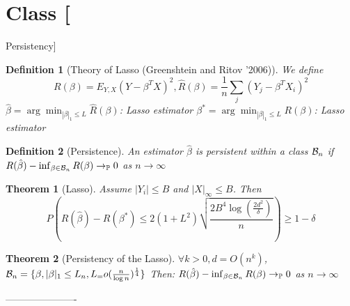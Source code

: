 \documentclass{article}
\newtheorem{theorem}{Theorem}
\newtheorem{definition}{Definition}
\newenvironment{class}[1]
{\section*{Class #1}}
{ ----------------------}
\begin{document}
\begin{class}{3}[Persistency]
  \begin{definition}[Theory of Lasso (Greenshtein and Ritov '2006)]
    We define
    $$R(\beta) = E_{Y, X} (Y - \beta^TX)^2, \hat R(\beta) = \frac1n \sum_j (Y_j - \beta^TX_i)^2$$
    $\hat \beta = \arg\min_{|\beta|_1 \le L} \hat R(\beta)$: Lasso estimator
    $\beta^* = \arg\min_{|\beta|_1 \le L} R(\beta)$: Lasso estimator
  \end{definition}
  \begin{definition}[Persistence]
    An estimator $\hat \beta$ is persistent within a class ${\cal B}_n$ if $R(\hat \beta) - \inf_{\beta \in {\cal B}_n} R(\beta) \rightarrow_{\mathbb P} 0$ as $n \rightarrow \infty$
  \end{definition}
  \begin{theorem}[Lasso]
    Assume $|Y_i| \le B$ and $|X|_{\infty} \le B$. Then
    $$P\left(R(\hat \beta) - R(\beta^*) \le 2 (1 + L^2) \sqrt{\frac{2B^4\log(\frac{2d^2}{\delta})}n} \right) \ge 1 - \delta$$
  \end{theorem}
  \begin{theorem}[Persistency of the Lasso]
    $\forall k > 0, d = O(n^k)$, ${\cal B}_n = \{\beta, |\beta|_1 \le L_n, L_ = o(\frac n{\log n})^{\frac14}\}$
    Then:
    $R(\hat \beta) - \inf_{\beta \in {\cal B}_n} R(\beta) \rightarrow_{\mathbb P} 0$ as $n \rightarrow \infty$
  \end{theorem}
\end{class}
\end{document}
